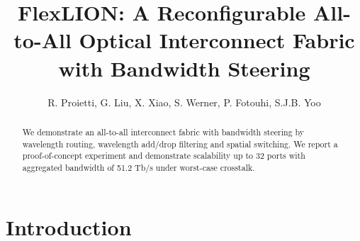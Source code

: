 \documentclass[letterpaper,10pt]{article}
\begin{document}
\title{FlexLION: A Reconfigurable All-to-All Optical Interconnect Fabric with Bandwidth Steering}
\vspace{-3ex}
\author{R. Proietti, G. Liu, X. Xiao, S. Werner, P. Fotouhi, S.J.B. Yoo}
\address{ Department of Electrical and Computer Engineering, University of California, Davis, CA 95616}
\vspace{-3ex}

\begin{abstract}
We demonstrate an all-to-all interconnect fabric with bandwidth steering by wavelength routing, wavelength add/drop filtering and spatial switching. We report a proof-of-concept experiment and demonstrate scalability up to 32 ports with aggregated bandwidth of 51.2 Tb/s under worst-case crosstalk.

\end{abstract}

\vspace{-3ex}
\section{Introduction}
\end{document}
